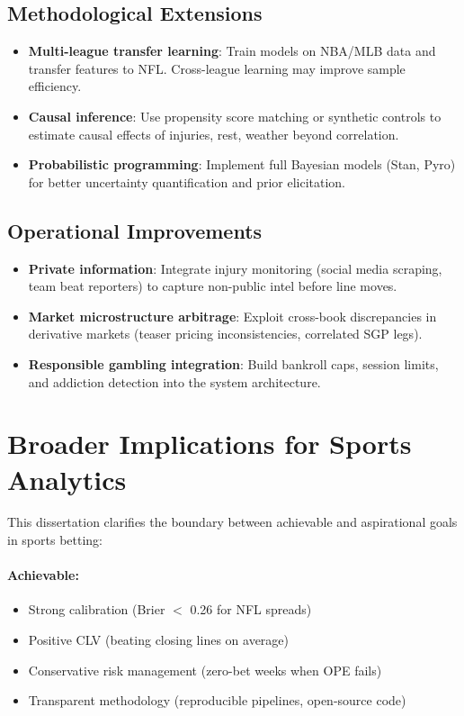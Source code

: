 \subsection{Methodological Extensions}
\begin{itemize}
  \item \textbf{Multi-league transfer learning}: Train models on NBA/MLB data and transfer features to NFL. Cross-league learning may improve sample efficiency.
  \item \textbf{Causal inference}: Use propensity score matching or synthetic controls to estimate causal effects of injuries, rest, weather beyond correlation.
  \item \textbf{Probabilistic programming}: Implement full Bayesian models (Stan, Pyro) for better uncertainty quantification and prior elicitation.
\end{itemize}

\subsection{Operational Improvements}
\begin{itemize}
  \item \textbf{Private information}: Integrate injury monitoring (social media scraping, team beat reporters) to capture non-public intel before line moves.
  \item \textbf{Market microstructure arbitrage}: Exploit cross-book discrepancies in derivative markets (teaser pricing inconsistencies, correlated SGP legs).
  \item \textbf{Responsible gambling integration}: Build bankroll caps, session limits, and addiction detection into the system architecture.
\end{itemize}

\section{Broader Implications for Sports Analytics}

This dissertation clarifies the boundary between achievable and aspirational goals in sports betting:

\paragraph{Achievable:}
\begin{itemize}
  \item Strong calibration (Brier $<$ 0.26 for NFL spreads)
  \item Positive CLV (beating closing lines on average)
  \item Conservative risk management (zero-bet weeks when OPE fails)
  \item Transparent methodology (reproducible pipelines, open-source code)
\end{itemize}

